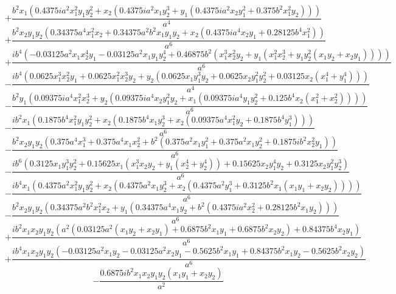 $$+\frac{b^{2} x_{1} \left(0.4375 i a^{2} x_{1}^{2} y_{1} y_{2}^{2} + x_{2} \left(0.4375 i a^{2} x_{1} y_{2}^{3} + y_{1} \left(0.4375 i a^{2} x_{2} y_{1}^{2} + 0.375 b^{2} x_{1}^{2} y_{2}\right)\right)\right)}{a^{4}}$$
$$+\frac{b^{2} x_{2} y_{1} y_{2} \left(0.34375 a^{4} x_{1}^{2} x_{2} + 0.34375 a^{2} b^{2} x_{1} y_{1} y_{2} + x_{2} \left(0.4375 i a^{4} x_{2} y_{1} + 0.28125 b^{4} x_{1}^{2}\right)\right)}{a^{6}}$$
$$+\frac{i b^{4} \left(- 0.03125 a^{2} x_{1} x_{2}^{4} y_{1} - 0.03125 a^{2} x_{1} y_{1} y_{2}^{4} + 0.46875 b^{2} \left(x_{1}^{3} x_{2}^{2} y_{2} + y_{1} \left(x_{1}^{2} x_{2}^{3} + y_{1} y_{2}^{2} \left(x_{1} y_{2} + x_{2} y_{1}\right)\right)\right)\right)}{a^{6}}$$
$$- \frac{i b^{4} \left(0.0625 x_{1}^{3} x_{2}^{2} y_{1} + 0.0625 x_{1}^{2} x_{2}^{3} y_{2} + y_{2} \left(0.0625 x_{1} y_{1}^{3} y_{2} + 0.0625 x_{2} y_{1}^{2} y_{2}^{2} + 0.03125 x_{2} \left(x_{1}^{4} + y_{1}^{4}\right)\right)\right)}{a^{4}}$$
$$- \frac{b^{2} y_{1} \left(0.09375 i a^{4} x_{1}^{2} x_{2}^{3} + y_{2} \left(0.09375 i a^{4} x_{2} y_{1}^{2} y_{2} + x_{1} \left(0.09375 i a^{4} y_{1} y_{2}^{2} + 0.125 b^{4} x_{2} \left(x_{1}^{2} + x_{2}^{2}\right)\right)\right)\right)}{a^{6}}$$
$$- \frac{i b^{2} x_{1} \left(0.1875 b^{4} x_{1}^{2} y_{1} y_{2}^{2} + x_{2} \left(0.1875 b^{4} x_{1} y_{2}^{3} + x_{2} \left(0.09375 a^{4} x_{1}^{2} y_{2} + 0.1875 b^{4} y_{1}^{3}\right)\right)\right)}{a^{6}}$$
$$- \frac{b^{2} x_{2} y_{1} y_{2} \left(0.375 a^{4} x_{1}^{3} + 0.375 a^{4} x_{1} x_{2}^{2} + b^{2} \left(0.375 a^{2} x_{1} y_{1}^{2} + 0.375 a^{2} x_{1} y_{2}^{2} + 0.1875 i b^{2} x_{2}^{2} y_{1}\right)\right)}{a^{6}}$$
$$- \frac{i b^{6} \left(0.3125 x_{1} y_{1}^{3} y_{2}^{2} + 0.15625 x_{1} \left(x_{1}^{3} x_{2} y_{2} + y_{1} \left(x_{2}^{4} + y_{2}^{4}\right)\right) + 0.15625 x_{2} y_{1}^{4} y_{2} + 0.3125 x_{2} y_{1}^{2} y_{2}^{3}\right)}{a^{6}}$$
$$- \frac{i b^{4} x_{1} \left(0.4375 a^{2} x_{1}^{2} y_{1} y_{2}^{2} + x_{2} \left(0.4375 a^{2} x_{1} y_{2}^{3} + x_{2} \left(0.4375 a^{2} y_{1}^{3} + 0.3125 b^{2} x_{1} \left(x_{1} y_{1} + x_{2} y_{2}\right)\right)\right)\right)}{a^{6}}$$
$$- \frac{b^{2} x_{2} y_{1} y_{2} \left(0.34375 a^{2} b^{2} x_{1}^{2} x_{2} + y_{1} \left(0.34375 a^{4} x_{1} y_{2} + b^{2} \left(0.4375 i a^{2} x_{2}^{2} + 0.28125 b^{2} x_{1} y_{2}\right)\right)\right)}{a^{6}}$$
$$+\frac{i b^{2} x_{1} x_{2} y_{1} y_{2} \left(a^{2} \left(0.03125 a^{2} \left(x_{1} y_{2} + x_{2} y_{1}\right) + 0.6875 b^{2} x_{1} y_{1} + 0.6875 b^{2} x_{2} y_{2}\right) + 0.84375 b^{4} x_{2} y_{1}\right)}{a^{6}}$$
$$+\frac{i b^{4} x_{1} x_{2} y_{1} y_{2} \left(- 0.03125 a^{2} x_{1} y_{2} - 0.03125 a^{2} x_{2} y_{1} - 0.5625 b^{2} x_{1} y_{1} + 0.84375 b^{2} x_{1} y_{2} - 0.5625 b^{2} x_{2} y_{2}\right)}{a^{6}}$$
$$- \frac{0.6875 i b^{2} x_{1} x_{2} y_{1} y_{2} \left(x_{1} y_{1} + x_{2} y_{2}\right)}{a^{2}}$$

